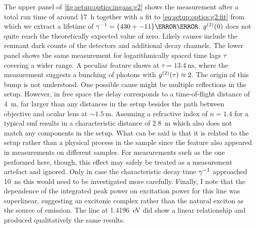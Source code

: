 The upper panel of \cref{fig:setup:optics:ingaas:g2} shows the measurement after a total run time of around \qty{17}{\hour} together with a fit to \cref{eq:setup:optics:g2:fit} from which we extract a lifetime of $\gamma\inverse = \qty{430+-11}{\pico\second}$.
$g^{(2)}(0)$ does not quite reach the theoretically expected value of zero.
Likely causes include the remnant dark counts of the detectors
and additional decay channels.
The lower panel shows the same measurement for logarithmically spaced time lags $\tau$ covering a wider range.
A peculiar feature shows at $\tau = \qty{13.4}{\nano\second}$, where the measurement suggests a bunching of photons with $g^{(2)}(\tau) \approx 2$.
The origin of this bump is not understood.
One possible cause might be multiple reflections in the setup.
However, in free space the delay corresponds to a time-of-flight distance of \qty{4}{\meter}, far larger than any distances in the setup besides the path between objective and ocular lens at $\sim\qty{1.5}{\meter}$.
Assuming a refractive index of $n=\num{1.4}$ for a typical \gls{smf} results in a characteristic distance of \qty{2.8}{\meter} which also does not match any components in the setup.
What can be said is that it is related to the setup rather than a physical process in the sample since the feature also appeared in  measurements on different samples.
For measurements such as the one performed here, though, this effect may safely be treated as a measurement artefact and ignored.
Only in case the characteristic decay time $\gamma^{-1}$ approached \qty{10}{\nano\second} this would need to be investigated more carefully.
Finally, I note that the dependence of the integrated peak power on excitation power for this line was superlinear, suggesting an excitonic complex rather than the natural exciton as the source of emission.
The line at \qty{1.4196}{\eV} did show a linear relationship and produced qualitatively the same  results.
